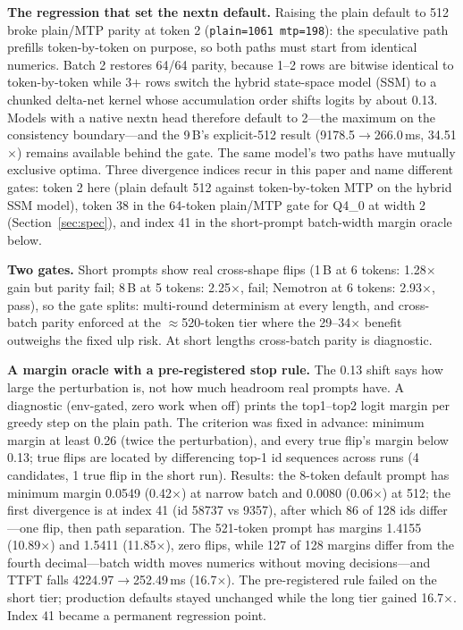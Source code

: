 \documentclass[letterpaper,twocolumn,10pt]{article}
\begin{document}
\textbf{The regression that set the nextn default.} Raising the plain default
to 512 broke plain/MTP parity at token 2 (\texttt{plain=1061 mtp=198}): the
speculative path prefills token-by-token on purpose, so both paths must start
from identical numerics. Batch 2 restores 64/64 parity, because 1--2 rows are
bitwise identical to token-by-token while 3+ rows switch the hybrid
state-space model (SSM)
to a chunked delta-net kernel whose accumulation order shifts logits by about
0.13. Models with a native nextn head therefore default to 2---the maximum on
the consistency boundary---and the 9\,B's explicit-512 result
(9178.5$\rightarrow$266.0\,ms, 34.51$\times$) remains available behind the
gate. The same model's two paths have mutually exclusive optima. Three
divergence indices recur in this paper and name different gates: token 2 here
(plain default 512 against token-by-token MTP on the hybrid SSM model), token 38
in the 64-token plain/MTP gate for Q4\_0 at width 2 (Section~\ref{sec:spec}),
and index 41 in the short-prompt batch-width margin oracle below.

\textbf{Two gates.} Short prompts show real cross-shape flips (1\,B at 6
tokens: 1.28$\times$ gain but parity fail; 8\,B at 5 tokens: 2.25$\times$,
fail; Nemotron at 6 tokens: 2.93$\times$, pass), so the gate splits:
multi-round determinism at every length, and cross-batch parity enforced at
the $\approx$520-token tier where the 29--34$\times$ benefit outweighs the
fixed ulp risk. At short lengths cross-batch parity is diagnostic.

\textbf{A margin oracle with a pre-registered stop rule.} The 0.13 shift says
how large the perturbation is, not how much headroom real prompts have. A
diagnostic (env-gated, zero work when off) prints the top1--top2 logit margin
per greedy step on the plain path. The criterion was fixed in advance: minimum
margin at least 0.26 (twice the perturbation), and every true flip's margin
below 0.13; true flips are located by differencing top-1 id sequences across
runs (4 candidates, 1 true flip in the short run). Results: the 8-token
default prompt has minimum margin 0.0549 (0.42$\times$) at narrow batch and
0.0080 (0.06$\times$) at 512; the first divergence is at index 41 (id 58737 vs
9357), after which 86 of 128 ids differ---one flip, then path separation. The
521-token prompt has margins 1.4155 (10.89$\times$) and 1.5411
(11.85$\times$), zero flips, while 127 of 128 margins differ from the fourth
decimal---batch width moves numerics without moving decisions---and TTFT falls
4224.97$\rightarrow$252.49\,ms (16.7$\times$). The pre-registered rule failed
on the short tier; production defaults stayed unchanged while the long tier
gained 16.7$\times$. Index 41 became a permanent regression point.
\end{document}

